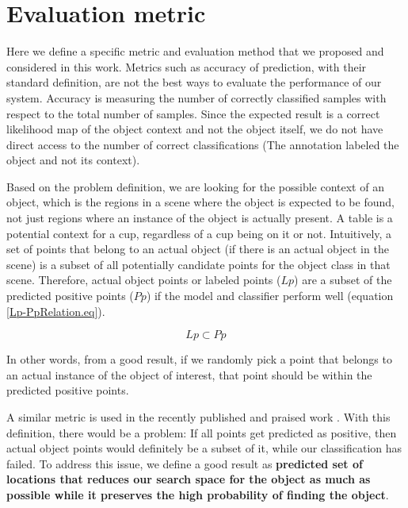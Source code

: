 \section{Evaluation metric}
\label{EvaluationMetric.sec}


Here we define a specific metric and evaluation method that we proposed and considered in this work.
Metrics such as accuracy of prediction, with their standard definition, are not the best ways to evaluate the performance of our system.
Accuracy is measuring the number of correctly classified samples with respect to the total number of samples.
Since the expected result is a correct likelihood map of the object context and not the object itself, we do not have direct access to the number of correct classifications (The annotation labeled the object and not its context). 

Based on the problem definition, we are looking for the possible context of an object, which is the regions in a scene where the 
object is expected to be found, not just regions where an instance of the object is actually present. A table is a potential context for a cup, regardless of a cup being on it or not.   
Intuitively, a set of points that belong to an actual object (if there is an actual object in the scene) is a subset of all 
potentially candidate points for the object class in that scene.
Therefore, actual object points or labeled points ($Lp$) are a subset of the predicted positive points ($Pp$) if the model and classifier perform 
well (equation \ref{Lp-PpRelation.eq}).

\begin{equation}
 \label{Lp-PpRelation.eq}
 Lp \subset Pp
\end{equation}

In other words, from a good result, if we randomly pick a point that belongs to an actual instance of the object of interest, that point should be within the predicted positive points. 

A similar metric is used in the recently published and praised work \cite{aydemir2012_3Dcontext}.
With this definition, there would be a problem: If all points get predicted as positive, then actual object points would 
definitely be a subset of it, while our classification has failed.
To address this issue, we define a good result as \textbf {predicted set of locations that reduces our search space for the object as much as 
possible while it preserves the high probability of finding the object}.

